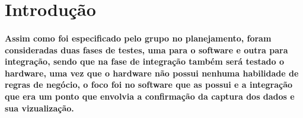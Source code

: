\section{Introdução}
\label{Sec:6-introducao}
%
\paragraph{%
Assim como foi especificado pelo grupo no planejamento, foram consideradas duas fases de testes, uma para o software e outra para integração, sendo que na fase de integração também será testado o hardware, uma vez que o hardware não possui nenhuma habilidade de regras de negócio, o foco foi no software que as possui e a integração que era um ponto que envolvia a confirmação da captura dos dados e sua vizualização.
}

